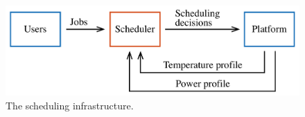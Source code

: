 \begin{figure}
  \centering
  \includegraphics[width=1.0\columnwidth]{include/assets/figures/scheduler.pdf}
  \caption{The scheduling infrastructure.}
\end{figure}

